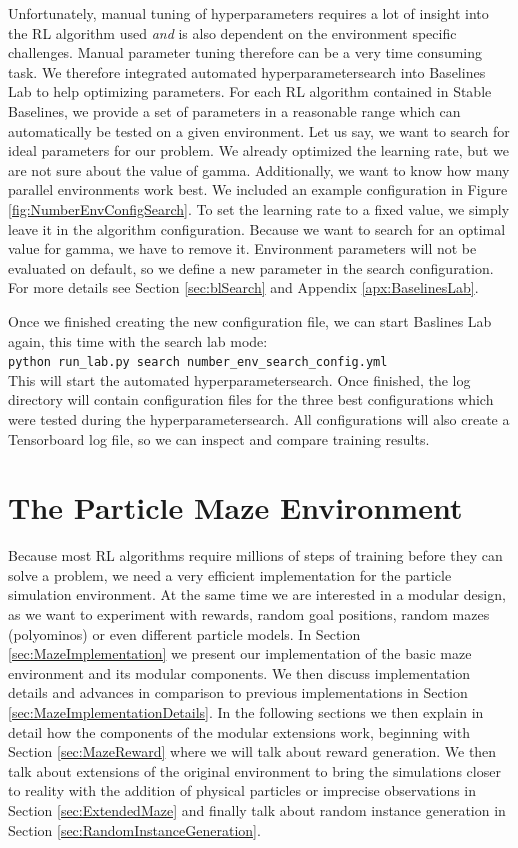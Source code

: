 Unfortunately, manual tuning of hyperparameters requires a lot of insight into the RL algorithm used \textit{and} is also dependent on the environment specific challenges. Manual parameter tuning therefore can be a very time consuming task. We therefore integrated automated hyperparametersearch into Baselines Lab to help optimizing parameters. For each RL algorithm contained in Stable Baselines, we provide a set of parameters in a reasonable range which can automatically be tested on a given environment. Let us say, we want to search for ideal parameters for our problem. We already optimized the learning rate, but we are not sure about the value of gamma. Additionally, we want to know how many parallel environments work best. We included an example configuration in Figure \ref{fig:NumberEnvConfigSearch}. To set the learning rate to a fixed value, we simply leave it in the algorithm configuration. Because we want to search for an optimal value for gamma, we have to remove it. Environment parameters will not be evaluated on default, so we define a new parameter in the search configuration. For more details see Section \ref{sec:blSearch} and Appendix \ref{apx:BaselinesLab}. 

Once we finished creating the new configuration file, we can start Baslines Lab again, this time with the search lab mode: \\

\texttt{python run\_lab.py search number\_env\_search\_config.yml} \\

\noindent This will start the automated hyperparametersearch. Once finished, the log directory will contain configuration files for the three best configurations which were tested during the hyperparametersearch. All configurations will also create a Tensorboard log file, so we can inspect and compare training results.

\newpage
\section{The Particle Maze Environment} \label{sec:MazeEnvironment}
Because most RL algorithms require millions of steps of training before they can solve a problem, we need a very efficient implementation for the particle simulation environment. At the same time we are interested in a modular design, as we want to experiment with rewards, random goal positions, random mazes (polyominos) or even different particle models. In Section \ref{sec:MazeImplementation} we present our implementation of the basic maze environment and its modular components. We then discuss implementation details and advances in comparison to previous implementations in Section \ref{sec:MazeImplementationDetails}. In the following sections we then explain in detail how the components of the modular extensions work, beginning with Section \ref{sec:MazeReward} where we will talk about reward generation. We then talk about extensions of the original environment to bring the simulations closer to reality with the addition of physical particles or imprecise observations in Section \ref{sec:ExtendedMaze} and finally talk about random instance generation in Section \ref{sec:RandomInstanceGeneration}.

